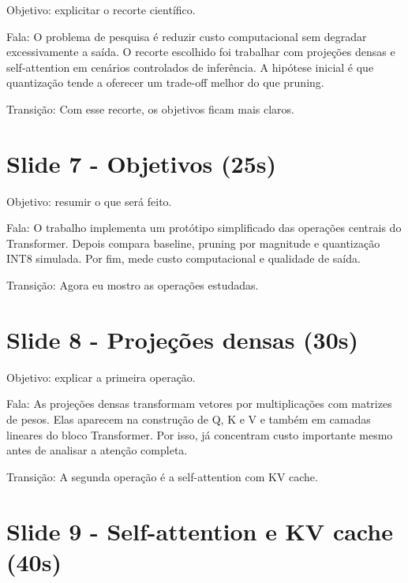 Objetivo: explicitar o recorte científico.






Fala: O problema de pesquisa é reduzir custo computacional sem degradar excessivamente a saída. O recorte escolhido foi trabalhar com projeções densas e self-attention em cenários controlados de inferência. A hipótese inicial é que quantização tende a oferecer um trade-off melhor do que pruning.




Transição: Com esse recorte, os objetivos ficam mais claros.



\section{Slide 7 - Objetivos (25s)}


Objetivo: resumir o que será feito.






Fala: O trabalho implementa um protótipo simplificado das operações centrais do Transformer. Depois compara baseline, pruning por magnitude e quantização INT8 simulada. Por fim, mede custo computacional e qualidade de saída.




Transição: Agora eu mostro as operações estudadas.



\section{Slide 8 - Projeções densas (30s)}


Objetivo: explicar a primeira operação.






Fala: As projeções densas transformam vetores por multiplicações com matrizes de pesos. Elas aparecem na construção de Q, K e V e também em camadas lineares do bloco Transformer. Por isso, já concentram custo importante mesmo antes de analisar a atenção completa.




Transição: A segunda operação é a self-attention com KV cache.



\section{Slide 9 - Self-attention e KV cache (40s)}


